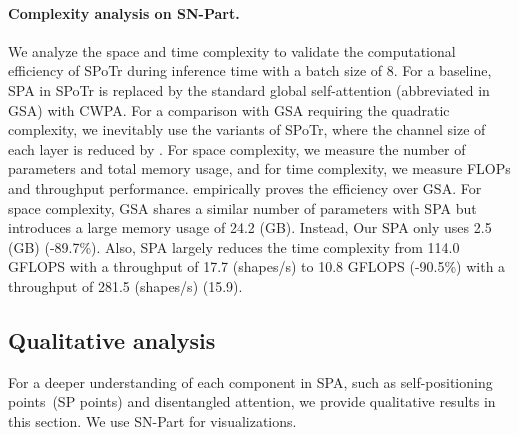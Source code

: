 \documentclass[10pt,twocolumn,letterpaper]{article}
\begin{document}
\begin{table}[t]
  \centering
{}

\caption{\textbf{Complexity analysis on SN-Part.} SPA: self-positioning point-based attention, GSA: global self-attention.}
\label{tab:complexity}
\end{table} 
 \paragraph{Complexity analysis on SN-Part.} 
We analyze the space and time complexity to validate the computational efficiency of SPoTr during inference time with a batch size of 8.
For a baseline, SPA in SPoTr is replaced by the standard global self-attention (abbreviated in GSA) with CWPA. 
For a comparison with GSA requiring the quadratic complexity, we inevitably use the variants of SPoTr, where the channel size of each layer is reduced by .
For space complexity, we measure  the number of parameters and total memory usage, and for time complexity, we measure FLOPs and throughput performance.
 empirically proves the efficiency over GSA.
For space complexity, GSA shares a similar number of parameters with SPA but introduces a large memory usage of 24.2 (GB). Instead, Our SPA only uses 2.5 (GB) (-89.7\%). Also, SPA largely reduces the time complexity from 114.0 GFLOPS with a throughput of 17.7 (shapes/s) to 10.8 GFLOPS (-90.5\%) with a throughput of 281.5 (shapes/s) (15.9).






     \subsection{Qualitative analysis}
    \label{sec:4.3}
For a deeper understanding of each component in SPA, such as self-positioning points~(SP points) and disentangled attention, we provide qualitative results in this section.
We use SN-Part for visualizations.
\end{document}
